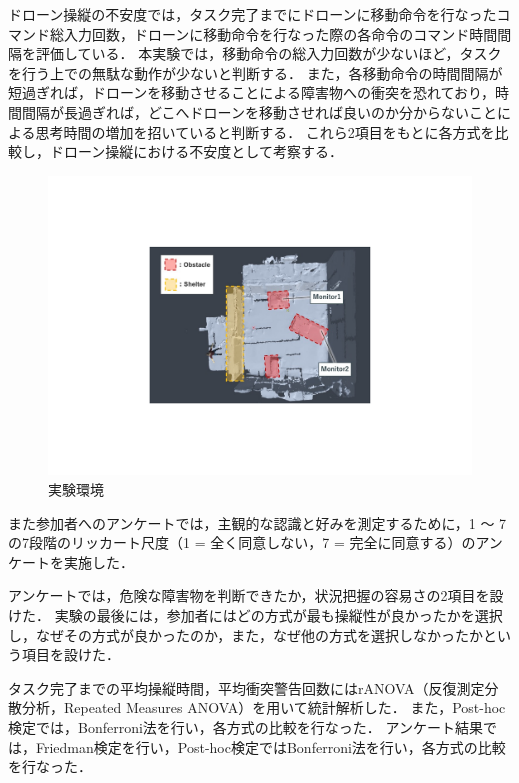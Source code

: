 \documentclass[a4paper,11pt]{ujreport}
\begin{document}
ドローン操縦の不安度では，タスク完了までにドローンに移動命令を行なったコマンド総入力回数，ドローンに移動命令を行なった際の各命令のコマンド時間間隔を評価している．
本実験では，移動命令の総入力回数が少ないほど，タスクを行う上での無駄な動作が少ないと判断する．
また，各移動命令の時間間隔が短過ぎれば，ドローンを移動させることによる障害物への衝突を恐れており，時間間隔が長過ぎれば，どこへドローンを移動させれば良いのか分からないことによる思考時間の増加を招いていると判断する．
これら2項目をもとに各方式を比較し，ドローン操縦における不安度として考察する．

\begin{figure}[!tb]
  \centering
  \includegraphics[width=0.7\linewidth]{img/05_experiment.pdf}
  \caption{実験環境}
  \label{fig:05_experiment}
\end{figure}


\par
また参加者へのアンケートでは，主観的な認識と好みを測定するために，1 〜 7 の7段階のリッカート尺度（1 = 全く同意しない，7 = 完全に同意する）のアンケートを実施した．
\par
アンケートでは，危険な障害物を判断できたか，状況把握の容易さの2項目を設けた．
実験の最後には，参加者にはどの方式が最も操縦性が良かったかを選択し，なぜその方式が良かったのか，また，なぜ他の方式を選択しなかったかという項目を設けた．
\par
タスク完了までの平均操縦時間，平均衝突警告回数にはrANOVA（反復測定分散分析，Repeated Measures ANOVA）を用いて統計解析した．
また，Post-hoc検定では，Bonferroni法を行い，各方式の比較を行なった．
アンケート結果では，Friedman検定を行い，Post-hoc検定ではBonferroni法を行い，各方式の比較を行なった．
    
\end{document}
